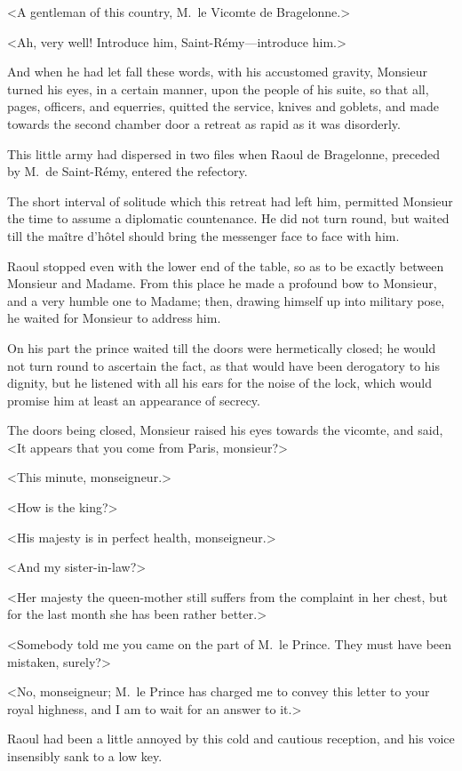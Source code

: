 <A gentleman of this country, M.~le Vicomte de Bragelonne.>

<Ah, very well! Introduce him, Saint-Rémy—introduce him.>

And when he had let fall these words, with his accustomed gravity, Monsieur turned his eyes, in a certain manner, upon the people of his suite, so that all, pages, officers, and equerries, quitted the service, knives and goblets, and made towards the second chamber door a retreat as rapid as it was disorderly.

This little army had dispersed in two files when Raoul de Bragelonne, preceded by M.~de Saint-Rémy, entered the refectory.

The short interval of solitude which this retreat had left him, permitted Monsieur the time to assume a diplomatic countenance. He did not turn round, but waited till the maître d'hôtel should bring the messenger face to face with him.

Raoul stopped even with the lower end of the table, so as to be exactly between Monsieur and Madame. From this place he made a profound bow to Monsieur, and a very humble one to Madame; then, drawing himself up into military pose, he waited for Monsieur to address him.

On his part the prince waited till the doors were hermetically closed; he would not turn round to ascertain the fact, as that would have been derogatory to his dignity, but he listened with all his ears for the noise of the lock, which would promise him at least an appearance of secrecy.

The doors being closed, Monsieur raised his eyes towards the vicomte, and said, <It appears that you come from Paris, monsieur?>

<This minute, monseigneur.>

<How is the king?>

<His majesty is in perfect health, monseigneur.>

<And my sister-in-law?>

<Her majesty the queen-mother still suffers from the complaint in her chest, but for the last month she has been rather better.>

<Somebody told me you came on the part of M.~le Prince. They must have been mistaken, surely?>

<No, monseigneur; M.~le Prince has charged me to convey this letter to your royal highness, and I am to wait for an answer to it.>

Raoul had been a little annoyed by this cold and cautious reception, and his voice insensibly sank to a low key.

